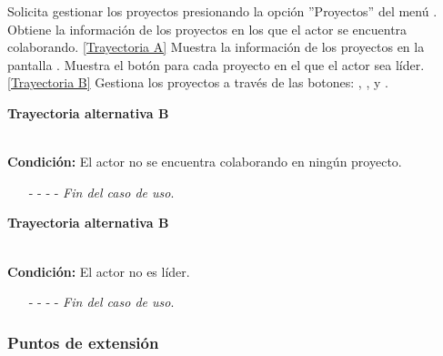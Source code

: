 \begin{UCtrayectoria}
	\UCpaso[\UCactor] Solicita gestionar los proyectos presionando la opción ''Proyectos'' del menú .
	\UCpaso[\UCsist] Obtiene la información de los proyectos en los que el actor se encuentra colaborando. \hyperlink{CU4:TAA}{[Trayectoria A]}
	\UCpaso[\UCsist] Muestra la información de los proyectos en la pantalla . \label{CU4-P3}
	\UCpaso[\UCsist] Muestra el botón  para cada proyecto en el que el actor sea líder. \hyperlink{CU4:TAB}{[Trayectoria B]}
	\UCpaso[\UCactor] Gestiona los proyectos a través de las botones: , ,  y . \label{CU4-P5}
\end{UCtrayectoria}		
\hypertarget{CU4:TAA}{\textbf{Trayectoria alternativa B}}\\
\noindent \textbf{Condición:} El actor no se encuentra colaborando en ningún proyecto.
\begin{enumerate}
	\UCpaso[\UCsist] Muestra el mensaje  en la pantalla  para indicar que no hay registros de proyectos para mostrar.
	\item[- -] - - {\em {Fin del caso de uso}}.%
\end{enumerate}


\hypertarget{CU4:TAB}{\textbf{Trayectoria alternativa B}}\\
\noindent \textbf{Condición:} El actor no es líder.
\begin{enumerate}
	\UCpaso[\UCactor] Gestiona los proyectos a través de las botones: ,  y . \label{CU4-TB1}
	\item[- -] - - {\em {Fin del caso de uso}}.%
\end{enumerate}

\subsubsection{Puntos de extensión}

